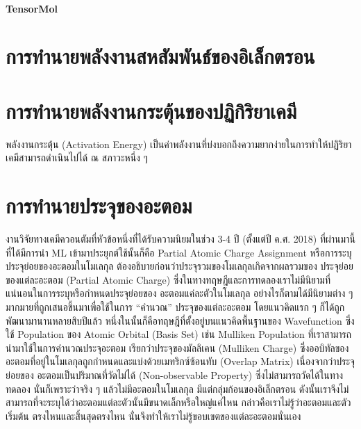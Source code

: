 \paragraph{TensorMol}\autocite{yao2018}

\section{การทำนายพลังงานสหสัมพันธ์ของอิเล็กตรอน}
\label{sec:pred_corre_ener}

\autocite{mcdonagh2018,nudejima2019,dick2020,han2021}

\section{การทำนายพลังงานกระตุ้นของปฏิกิริยาเคมี}
\label{sec:pred_act_ener}

พลังงานกระตุ้น (Activation Energy) เป็นค่าพลังงานที่บ่งบอกถึงความยากง่ายในการทำให้ปฏิริยาเคมีสามารถดำเนินไปได้ ณ สภาวะหนึ่ง ๆ

\section{การทำนายประจุของอะตอม}
\label{sec:pred_atomic_charge}

งานวิจัยทางเคมีควอนตัมที่หัวข้อหนึ่งที่ได้รับความนิยมในช่วง 3-4 ปี (ตั้งแต่ปี ค.ศ. 2018) ที่ผ่านมานี้ที่ได้มีการนำ ML เข้ามาประยุกต์ใช้นั้นก็คือ 
Partial Atomic Charge Assignment หรือการระบุประจุย่อยของอะตอมในโมเลกุล ต้องอธิบายก่อนว่าประจุรวมของโมเลกุลเกิดจากผลรวมของ%
ประจุย่อยของแต่ละอะตอม (Partial Atomic Charge) ซึ่งในทางทฤษฎีและการทดลองเราไม่มีนิยามที่แน่นอนในการระบุหรือกำหนดประจุย่อยของ%
อะตอมแค่ละตัวในโมเลกุล อย่างไรก็ตามได้มีนิยามต่าง ๆ มากมายที่ถูกเสนอขึ้นมาเพื่อใช้ในการ \enquote{คำนวณ} ประจุของแต่ละอะตอม 
โดยแนวคิดแรก ๆ ก็ได้ถูกพัฒนามานานหลายสิบปีแล้ว หนึ่งในนั้นก็คือทฤษฎีที่ตั้งอยู่บนแนวคิดพื้นฐานของ Wavefunction ซึ่งใช้ Population 
ของ Atomic Orbital (Basis Set) เช่น Mulliken Population ที่เราสามารถนำมาใช้ในการคำนวณประจุอะตอม เรียกว่าประจุของมัลลิเคน 
(Mulliken Charge) ซึ่งออบิทัลของอะตอมที่อยู่ในโมเลกุลถูกกำหนดและแบ่งด้วยเมทริกซ์ซ้อนทับ (Overlap Matrix) เนื่องจากว่าประจุย่อยของ%
อะตอมเป็นปริมาณที่วัดไม่ได้ (Non-observable Property) ซึ่งไม่สามารถวัดได้ในทางทดลอง นั่นก็เพราะว่าจริง ๆ แล้วไม่มีอะตอมในโมเลกุล 
มีแต่กลุ่มก้อนของอิเล็กตรอน ดังนั้นเราจึงไม่สามารถที่จะระบุได้ว่าอะตอมแต่ละตัวนั้นมีขนาดเล็กหรือใหญ่แค่ไหน กล่าวคือเราไม่รู้ว่าอะตอมและตัวเริ่มต้น%
ตรงไหนและสิ้นสุดตรงไหน นั่นจึงทำให้เราไม่รู้ขอบเขตของแต่ละอะตอมนั่นเอง

